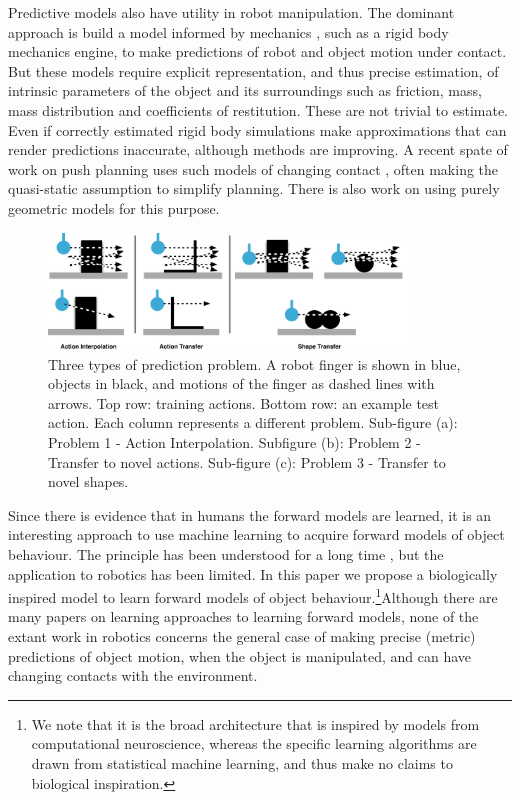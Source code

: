 Predictive models also have utility in robot manipulation. The dominant approach is build a model informed by mechanics \citep{mason_manipulator_1982,lynch_mechanics_1992,peshkin_motion_1988,cappelleri_designing_2006,mason_mechanics_2001,flickinger2015}, such as a rigid body mechanics engine, to make predictions of robot and object motion under contact. But these models require explicit representation, and thus precise estimation, of intrinsic parameters of the object and its surroundings such as friction, mass, mass distribution and coefficients of restitution. These are not trivial to estimate. Even if correctly estimated rigid body simulations make approximations that can render predictions inaccurate, although methods are improving. A recent spate of work on push planning uses such models of changing contact \citep{Dogar_2010,zitoetal-iros12,Cosgun2011}, often making the quasi-static assumption to simplify planning. There is also work on using purely geometric models \citep{stillman08ijrr} for this purpose.

\def\stackalignment{l}
\begin{figure}[t]
\centerline{\includegraphics[width=0.85\textwidth]{three-prediction-problems}}
\caption{Three types of prediction problem. A robot finger is shown in blue, objects in black, and motions of the finger as dashed lines with arrows. Top row: training actions. Bottom row: an example test action. Each column represents a different problem. Sub-figure (a): Problem 1 - Action Interpolation. Subfigure (b): Problem 2 - Transfer to novel actions. Sub-figure (c): Problem 3 - Transfer to novel shapes. \label{fig:three-prediction-problems}}
\end{figure}

Since there is evidence that in humans the forward models are learned, it is an interesting approach to use machine learning to acquire forward models of object behaviour. The principle has been understood for a long time \citep{JordanJacobs90,JordanRumelhart92}, but the application to robotics has been limited. In this paper we propose a biologically inspired model to learn forward models of object behaviour.\footnote{We note that it is the broad architecture that is inspired by models from computational neuroscience, whereas the specific learning algorithms are drawn from statistical machine learning, and thus make no claims to biological inspiration.}Although there are many papers on learning approaches to learning forward models, none of the extant work in robotics concerns the general case of making precise (metric) predictions of object motion, when the object is manipulated, and can have changing contacts with the environment.